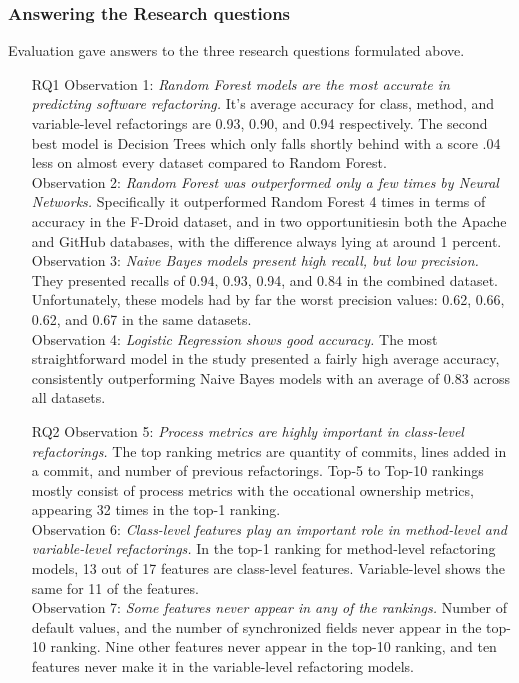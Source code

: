\subsubsection{Answering the Research questions}
Evaluation gave answers to the three research questions formulated above. 
\begin{itemize}
    \item[RQ1] Observation 1: \textit{Random Forest models are the most accurate in predicting software refactoring.} It's average accuracy for class, method, and variable-level refactorings are 0.93, 0.90, and 0.94 respectively. The second best model is Decision Trees which only falls shortly behind with a score .04 less on almost every dataset compared to Random Forest.\\Observation 2: \textit{Random Forest was outperformed only a few times by Neural Networks.} Specifically it outperformed Random Forest 4 times in terms of accuracy in the F-Droid dataset, and in two opportunitiesin both the Apache and GitHub databases, with the difference always lying at around 1 percent. \\ Observation 3: \textit{Naive Bayes models present high recall, but low precision.} They presented recalls of 0.94, 0.93, 0.94, and 0.84 in the combined dataset. Unfortunately, these models had by far the worst precision values: 0.62, 0.66, 0.62, and 0.67 in the same datasets. \\ Observation 4: \textit{Logistic Regression shows good accuracy.} The most straightforward model in the study presented a fairly high average accuracy, consistently outperforming Naive Bayes models with an average of 0.83 across all datasets. 
    \item[RQ2] Observation 5: \textit{Process metrics are highly important in class-level refactorings.} The top ranking metrics are quantity of commits, lines added in a commit, and number of previous refactorings. Top-5 to Top-10 rankings mostly consist of process metrics with the occational ownership metrics, appearing 32 times in the top-1 ranking. \\ Observation 6: \textit{Class-level features play an important role in method-level and variable-level refactorings.} In the top-1 ranking for method-level refactoring models, 13 out of 17 features are class-level features. Variable-level shows the same for 11 of the features. \\ Observation 7: \textit{Some features never appear in any of the rankings.} Number of default values, and the number of synchronized fields never appear in the top-10 ranking. Nine other features never appear in the top-10 ranking, and ten features never make it in the variable-level refactoring models.

\end{itemize}
